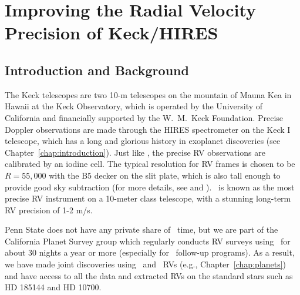 \chapter{Improving the Radial Velocity Precision of Keck/HIRES}\label{chap:keck}


\section{Introduction and Background}

The Keck telescopes are two 10-m telescopes on the mountain of Mauna
Kea in Hawaii at the Keck Observatory, which is operated by the
University of California and financially supported by the W.\ M.\ Keck
Foundation. Precise Doppler observations are made through the HIRES
spectrometer \citep{1994SPIE.2198..362V} on the Keck I telescope,
which has a long and glorious history in exoplanet discoveries (see
Chapter~\ref{chap:introduction}). Just like \het, the precise RV
observations are calibrated by an iodine cell. The typical resolution
for RV frames is chosen to be $R=55,000$ with the B5 decker on the
slit plate, which is also tall enough to provide good sky subtraction
(for more details, see \citealt{2009ApJ...696...75H} and
\citealt{2009ApJ...702..989V}). \keck\ is known as the most precise RV
instrument on a 10-meter class telescope, with a stunning long-term RV
precision of 1-2 m/s.

Penn State does not have any private share of \keck\ time, but we are
part of the California Planet Survey group which regularly conducts RV
surveys using \keck\ for about 30 nights a year or more (especially
for \kepler\ follow-up programs). As a result, we have made joint
discoveries using \keck\ and \het\ RVs (e.g.,
Chapter~\ref{chap:planets}) and have access to all the data and
extracted RVs on the standard stars such as HD 185144 and HD 10700.

